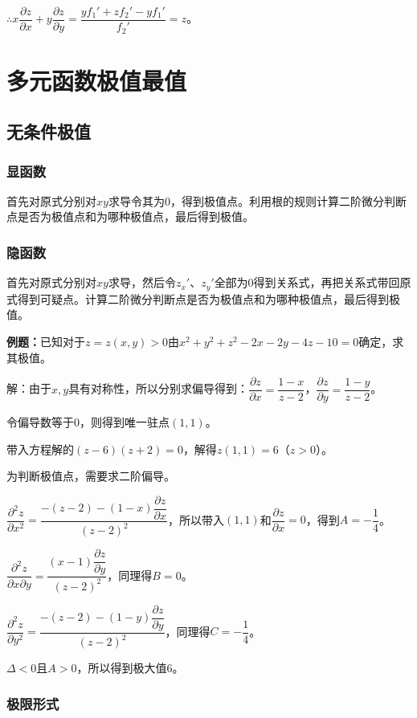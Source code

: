 \documentclass[UTF8, 12pt]{ctexart}
\begin{document}
$\therefore x\dfrac{\partial z}{\partial x}+y\dfrac{\partial z}{\partial y}=\dfrac{yf_1'+zf_2'-yf_1'}{f_2'}=z$。

\section{多元函数极值最值}

\subsection{无条件极值}

\subsubsection{显函数}

首先对原式分别对$xy$求导令其为0，得到极值点。利用根的规则计算二阶微分判断点是否为极值点和为哪种极值点，最后得到极值。

\subsubsection{隐函数}

首先对原式分别对$xy$求导，然后令$z_x'$、$z_y'$全部为0得到关系式，再把关系式带回原式得到可疑点。计算二阶微分判断点是否为极值点和为哪种极值点，最后得到极值。

\textbf{例题：}已知对于$z=z(x,y)>0$由$x^2+y^2+z^2-2x-2y-4z-10=0$确定，求其极值。

解：由于$x,y$具有对称性，所以分别求偏导得到：$\dfrac{\partial z}{\partial x}=\dfrac{1-x}{z-2}$，$\dfrac{\partial z}{\partial y}=\dfrac{1-y}{z-2}$。

令偏导数等于0，则得到唯一驻点$(1,1)$。

带入方程解的$(z-6)(z+2)=0$，解得$z(1,1)=6$（$z>0$）。

为判断极值点，需要求二阶偏导。

$\dfrac{\partial^2z}{\partial x^2}=\dfrac{-(z-2)-(1-x)\dfrac{\partial z}{\partial x}}{(z-2)^2}$，所以带入$(1,1)$和$\dfrac{\partial z}{\partial x}=0$，得到$A=-\dfrac{1}{4}$。

$\dfrac{\partial^2z}{\partial x\partial y}=\dfrac{(x-1)\dfrac{\partial z}{\partial y}}{(z-2)^2}$，同理得$B=0$。

$\dfrac{\partial^2z}{\partial y^2}=\dfrac{-(z-2)-(1-y)\dfrac{\partial z}{\partial y}}{(z-2)^2}$，同理得$C=-\dfrac{1}{4}$。

$\Delta<0$且$A>0$，所以得到极大值6。

\subsubsection{极限形式}
\end{document}
